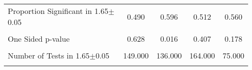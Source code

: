 {\begin{tabular}{l*{4}{c}}
                &                  &                  &                  &                  \\
\hline Proportion Significant in 1.65$\pm$0.05&    0.490         &    0.596         &    0.512         &    0.560         \\
                &                  &                  &                  &                  \\
One Sided p-value&    0.628         &    0.016         &    0.407         &    0.178         \\
                &                  &                  &                  &                  \\
Number of Tests in 1.65$\pm$0.05&  149.000         &  136.000         &  164.000         &   75.000         \\
                &                  &                  &                  &                  \\
\hline\hline
\end{tabular}
}
